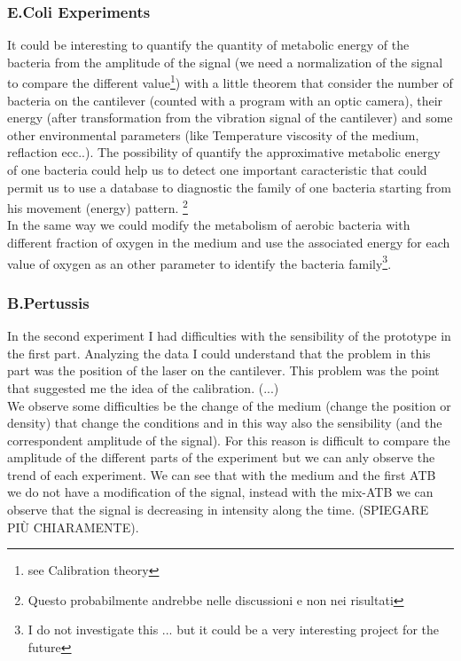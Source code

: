 \documentclass[11pt, a4paper]{article}
\begin{document}
\subsubsection{E.Coli Experiments}
It could be interesting to quantify the quantity of metabolic energy of the bacteria from the amplitude of the signal (we need a normalization of the signal to compare the different value\footnote{see Calibration theory}) with a little theorem that consider the number of bacteria on the cantilever (counted with a program with an optic camera), their energy (after transformation from the vibration signal of the cantilever) and some other environmental parameters (like Temperature viscosity of the medium, reflaction ecc..)\cite{Danis idea}. 
The possibility of quantify the approximative metabolic energy of one bacteria could help us to detect one important caracteristic that could permit us to use a database to diagnostic the family of one bacteria starting from his movement (energy) pattern\cite{Sandor Idea of NeuronalMap}. \footnote{Questo probabilmente andrebbe nelle discussioni e non nei risultati}\\ In the same way we could modify the metabolism of aerobic bacteria with different fraction of oxygen in the medium and use the associated energy for each value of oxygen as an other parameter to identify the bacteria family\footnote{I do not investigate this ... but it could be a very interesting project for the future}.

\subsubsection{B.Pertussis}%
In the second experiment  I had difficulties with the  sensibility of the prototype in the first part. Analyzing the data I could understand that the problem in this part was the position of the laser on the cantilever. This problem was the point that  suggested me the idea of the calibration. 
(...)\\
   We observe some difficulties be the change of the medium (change the position or density) that change the conditions and in this way also the sensibility (and the correspondent amplitude of the signal). For this reason is difficult to compare the amplitude of the different parts of the experiment but we can anly observe the trend of each experiment. We can see that with the medium and the first ATB we do not have a modification of the signal, instead with the mix-ATB we can observe that the signal is decreasing in intensity along the time. (SPIEGARE PIÙ CHIARAMENTE).
\end{document}
